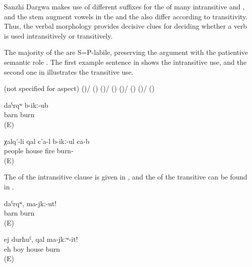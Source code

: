 Sanzhi Dargwa makes use of different suffixes for the  of many intransitive and , and the stem augment vowels in the  and the  also differ according to transitivity. Thus, the verbal morphology provides decisive clues for deciding whether a verb is used intransitively or transitively.

The majority of the  are S=P-labile, preserving the argument with the patientive semantic role . The first example sentence in  shows the intransitive use, and the second one in  illustrates the transitive use.
%
\begin{exe}
	\ex	\label{ex:S=P labile verbs}
	\begin{xlist}
		\ex {}  (not specified for aspect)
		\ex	{} ()\slash{} () 
		\ex	{} ()\slash{} () 
		\ex	{} ()\slash{} () 
		\ex	{} ()\slash{} () 
	\end{xlist}
\end{exe}

%
\begin{exe}
	\ex	\label{ex:The barn burnt}
	\gll	daˁrqʷ	b-ikː-ub\\
		barn	burn\\
	\glt	{} (E)

	\ex	\label{ex:The people burn the house with fire}
	\gll	χalq'-li	qal	c'a-l	b-ikː-ul	ca-b\\
		people	house	fire	burn-	\\
	\glt	{} (E)
\end{exe}

The  of the intransitive clause is given in , and the  of the transitive can be found in .
%
\begin{exe}
	\ex	\label{ex:‎‎‎Barn, do not burn}
	\gll	daˁrqʷ,	ma-jkː-ut!\\
		barn	burn\\
	\glt	{} (E)

	\ex	\label{ex:‎Eh boy, do not burn the house}
	\gll	ej	durħuˁ,		qal	ma-jkːʷ-it!\\
		eh	boy	house	burn\\
	\glt	{} (E)
\end{exe}


